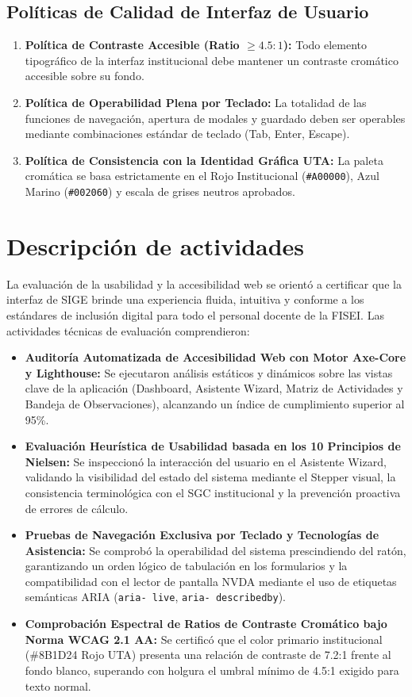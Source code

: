 \documentclass[12pt,a4paper]{article}
\begin{document}
\subsection{Políticas de Calidad de Interfaz de Usuario}
\begin{enumerate}[leftmargin=1.5em, itemsep=2pt]
    \item \textbf{Política de Contraste Accesible (Ratio $\ge 4.5:1$):} Todo elemento tipográfico de la interfaz institucional debe mantener un contraste cromático accesible sobre su fondo.
    \item \textbf{Política de Operabilidad Plena por Teclado:} La totalidad de las funciones de navegación, apertura de modales y guardado deben ser operables mediante combinaciones estándar de teclado (Tab, Enter, Escape).
    \item \textbf{Política de Consistencia con la Identidad Gráfica UTA:} La paleta cromática se basa estrictamente en el Rojo Institucional (\texttt{\#A00000}), Azul Marino (\texttt{\#002060}) y escala de grises neutros aprobados.
\end{enumerate}

\section{Descripción de actividades}
La evaluación de la usabilidad y la accesibilidad web se orientó a certificar que la interfaz de SIGE brinde una experiencia fluida, intuitiva y conforme a los estándares de inclusión digital para todo el personal docente de la FISEI. Las actividades técnicas de evaluación comprendieron:

\begin{itemize}[leftmargin=1.5em, itemsep=4pt]
    \item \textbf{Auditoría Automatizada de Accesibilidad Web con Motor Axe-Core y Lighthouse:} Se ejecutaron análisis estáticos y dinámicos sobre las vistas clave de la aplicación (Dashboard, Asistente Wizard, Matriz de Actividades y Bandeja de Observaciones), alcanzando un índice de cumplimiento superior al 95\%.
    \item \textbf{Evaluación Heurística de Usabilidad basada en los 10 Principios de Nielsen:} Se inspeccionó la interacción del usuario en el Asistente Wizard, validando la visibilidad del estado del sistema mediante el Stepper visual, la consistencia terminológica con el SGC institucional y la prevención proactiva de errores de cálculo.
    \item \textbf{Pruebas de Navegación Exclusiva por Teclado y Tecnologías de Asistencia:} Se comprobó la operabilidad del sistema prescindiendo del ratón, garantizando un orden lógico de tabulación en los formularios y la compatibilidad con el lector de pantalla NVDA mediante el uso de etiquetas semánticas ARIA (\texttt{aria- live}, \texttt{aria- describedby}).
    \item \textbf{Comprobación Espectral de Ratios de Contraste Cromático bajo Norma WCAG 2.1 AA:} Se certificó que el color primario institucional (\#8B1D24 Rojo UTA) presenta una relación de contraste de 7.2:1 frente al fondo blanco, superando con holgura el umbral mínimo de 4.5:1 exigido para texto normal.
\end{itemize}
\end{document}
